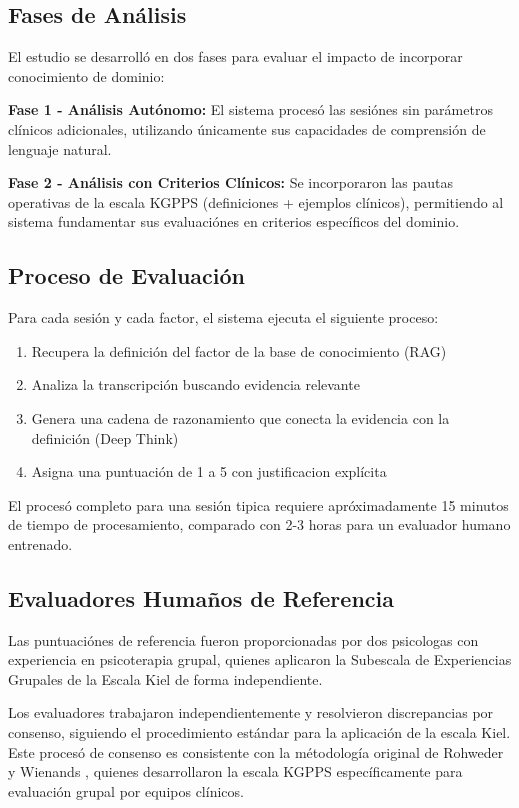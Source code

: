 \documentclass[12pt,a4paper,twoside]{book}
\begin{document}
\subsection{Fases de Análisis}

El estudio se desarrolló en dos fases para evaluar el impacto de incorporar conocimiento de dominio:

\textbf{Fase 1 - Análisis Autónomo:} El sistema procesó las sesiónes sin parámetros clínicos adicionales, utilizando únicamente sus capacidades de comprensión de lenguaje natural.

\textbf{Fase 2 - Análisis con Criterios Clínicos:} Se incorporaron las pautas operativas de la escala KGPPS (definiciones + ejemplos clínicos), permitiendo al sistema fundamentar sus evaluaciónes en criterios específicos del dominio.

\subsection{Proceso de Evaluación}

Para cada sesión y cada factor, el sistema ejecuta el siguiente proceso:

\begin{enumerate}
    \item Recupera la definición del factor de la base de conocimiento (RAG)
    \item Analiza la transcripción buscando evidencia relevante
    \item Genera una cadena de razonamiento que conecta la evidencia con la definición (Deep Think)
    \item Asigna una puntuación de 1 a 5 con justificacion explícita
\end{enumerate}

El procesó completo para una sesión tipica requiere apróximadamente 15 minutos de tiempo de procesamiento, comparado con 2-3 horas para un evaluador humano entrenado.

\subsection{Evaluadores Humaños de Referencia}

Las puntuaciónes de referencia fueron proporcionadas por dos psicologas con experiencia en psicoterapia grupal, quienes aplicaron la Subescala de Experiencias Grupales de la Escala Kiel de forma independiente.

Los evaluadores trabajaron independientemente y resolvieron discrepancias por consenso, siguiendo el procedimiento estándar para la aplicación de la escala Kiel. Este procesó de consenso es consistente con la métodología original de Rohweder y Wienands \cite{rohweder1993}, quienes desarrollaron la escala KGPPS específicamente para evaluación grupal por equipos clínicos.
\end{document}
